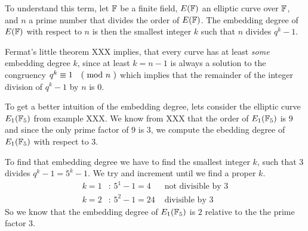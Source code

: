 To understand this term, let $\mathbb{F}$ be a finite field, $E(\mathbb{F})$ an elliptic curve over $\mathbb{F}$, and $n$ a prime number that divides the order of $E(\mathbb{F})$. The embedding degree of $E(\mathbb{F})$ with respect to $n$ is then the smallest integer $k$ such that $n$ divides $q^k-1$.

Fermat's little theorem XXX implies, that every curve has at least \textit{some} embedding degree $k$, since at least $k=n-1$ is always a solution to the congruency
$q^k \equiv 1 \quad \text{( mod } n \text{ )}$ which implies that the remainder of the integer division of $q^k-1$ by $n$ is $0$.
\begin{example} To get a better intuition of the embedding degree, lets consider the elliptic curve $E_1(\mathbb{F}_5)$ from example XXX. We know from XXX that the order of $E_1(\mathbb{F}_5)$ is $9$ and since the only prime factor of $9$ is $3$, we compute the ebedding degree of $E_1(\mathbb{F}_5)$ with respect to $3$.

To find that embedding degree we have to find the smallest integer $k$, such that $3$ divides $q^k-1= 5^k-1$. We try and increment until we find a proper $k$.
\begin{align*}
k=1 &\text{: } 5^1-1 = 4 & \text{ not divisible by } 3\\
k=2 &\text{: } 5^2-1 = 24 & \text{ divisible by } 3
\end{align*}
So we know that the embedding degree of $E_1(\mathbb{F}_5)$ is $2$ relative to the the prime factor $3$.
\end{example}
